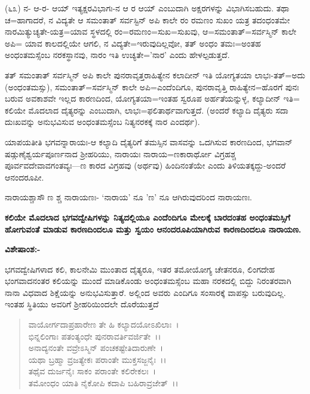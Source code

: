 (೬೩) ನ- ಆ-ರ- ಆಯ್ ಇತ್ಯಕ್ಷರವಿಭಾಗಃ-ನ ಆ ರ ಆಯ್ ಎಂಬುದಾಗಿ ಅಕ್ಷರಗಳನ್ನು ವಿಭಾಗಿಸಬಹುದು. ತಥಾ ಚ=ಹಾಗಾದರೆ, ನ ವಿದ್ಯತೇ ಆ ಸಮಂತಾತ್ ಸರ್ವಸ್ಟಿನ್ ಅಪಿ ಕಾಲೇ ರಂ ರಮಣಂ ಸುಖಂ ಯತ್ರ ತದಂಧಂತಮೇ ನಾರಮಿತ್ಯುಚ್ಯತೇ-ಯತ್ರ=ಯಾವ ಸ್ಥಳದಲ್ಲಿ ರಂ=ರಮಣಂ=ಸುಖ=ಸುಖವು, ಆ=ಸಮಂತಾತ್=ಸರ್ವಸ್ಮಿನ್ ಕಾಲೇ ಅಪಿ= ಯಾವ ಕಾಲದಲ್ಲಿಯೇ ಆಗಲಿ, ನ ವಿದ್ಯತೇ=ಇರುವುದಿಲ್ಲವೋ, ತತ್ ಅಂಧಂ ತಮಃ=ಅಂತಹ ಅಂಧಂತಮಸ್ಸೆಂಬ ನರಕಸ್ಥಾನವು, ನಾರಂ ಇತಿ ಉಚ್ಯತೇ='ನಾರ' ಎಂದು ಹೇಳಲ್ಪಡುತ್ತದೆ.

ತತ್ ಸಮಂತಾತ್ ಸರ್ವಸ್ಮಿನ್ ಅಪಿ ಕಾಲೇ ಪುನರಾವೃತ್ತರಾಹಿತ್ಯೇನ ಕಲಾದೀನ್ ಇತಿ ಯೋಗ್ಯತಯಾ ಲಾಭಃ-ತತ್=ಅದು (ಅಂಧಂತಮಸ್ಸು), ಸಮಂತಾತ್=ಸರ್ವಸ್ಮಿನ್ ಕಾಲೇ ಅಪಿ=ಎಂದೆಂದಿಗೂ, ಪುನರಾವೃತ್ತಿ ರಾಹಿತ್ಯೇನ=ಹೊರಗೆ ಪುನಃ ಬರುವ ಅವಕಾಶವೇ ಇಲ್ಲದ ಕಾರಣದಿಂದ, ಯೋಗ್ಯತಯಾ=ಇಂತಹ ಸ್ವರೂಪ ಅರ್ಹತೆಯನ್ನುಳ್ಳ, ಕಲ್ಯಾದೀನ್ ಇತಿ= ಕಲಿಯೇ ಮೊದಲಾದ ದೈತ್ಯರನ್ನು ಎಂಬುದಾಗಿ, ಲಾಭಃ=ಫಲಿತಾರ್ಥವಾಗುತ್ತದೆ. (ಅಂದರೆ ಕಲ್ಯಾದಿ ದೈತ್ಯರು ಸದಾ ದುಃಖವನ್ನು ಅನುಭವಿಸುವ ಅಂಧಂತಮಸ್ಸೆಂಬ ನಿತ್ಯನರಕಕ್ಕೆ ನಾರ ಎಂದರ್ಥ).

ಯಾಪಯತೀತಿ ಭಗವನ್ನಾರಾಯಃ-ಆ ಕಲ್ಯಾದಿ ದೈತ್ಯರಿಗೆ ತಮಸ್ಸಿನ ವಾಸವನ್ನು ಒದಗಿಸುವ ಕಾರಣದಿಂದ, ಭಗವಾನ್ ಷಡ್ಗುಣೈಶ್ವರ್ಯಪೂರ್ಣನಾದ ಶ‍್ರೀಹರಿಯು, ನಾರಾಯಃ ನಾರಾಯ=ಣಕಾರಾರ್ಥೋ ವಿಗ್ರಹಶ್ಚ ಪೂರ್ವವದೇವಾವಗಂತವ್ಯಃ—ಣ ಕಾರದ ವಿಗ್ರಹವು (ಅರ್ಥವು) ಹಿಂದಿನಂತೆಯೇ ಎಂದು ತಿಳಿಯತಕ್ಕದ್ದು-ಅಂದರೆ ಆನಂದರೂಪೀ.

ನಾರಾಯಶ್ಚಾಸೌ ಣ ಶ್ಚ ನಾರಾಯಣಃ- `ನಾರಾಯ' ನೂ 'ಣ' ನೂ ಆಗಿರುವುದರಿಂದ ನಾರಾಯಣಃ.

\begin{center}
\textbf{ಕಲಿಯೇ ಮೊದಲಾದ ಭಗವದ್ವೇಷಿಗಳನ್ನು ನಿತ್ಯದಲ್ಲಿಯೂ ಎಂದೆಂದಿಗೂ ಮೇಲಕ್ಕೆ ಬಾರದಂತಹ ಅಂಧಂತಮಸ್ಸಿಗೆ ಹೋಗುವಂತೆ ಮಾಡುವ ಕಾರಣದಿಂದಲೂ ಮತ್ತು ಸ್ವಯಂ ಆನಂದರೂಪಿಯಾಗಿರುವ ಕಾರಣದಿಂದಲೂ ನಾರಾಯಣ.}
\end{center}

\noindent
\textbf{ವಿಶೇಷಾಂಶ:-}

ಭಗವದ್ವೇಷಿಗಳಾದ ಕಲಿ, ಕಾಲನೇಮಿ ಮುಂತಾದ ದೈತ್ಯರೂ, ಇತರ ತಮೋಯೋಗ್ಯ ಚೇತನರೂ, ಲಿಂಗದೇಹ ಭಂಗವಾದನಂತರ ಕಲಿಯನ್ನು ಮುಂದೆ ಮಾಡಿಕೊಂಡು ಅಂಧಂತಮಸ್ಸೆಂಬ ಮಹಾ ನರಕದಲ್ಲಿ ಬಿದ್ದು ನಿರಂತರವಾಗಿ ನಾನಾ ವಿಧವಾದ ಶಿಕ್ಷೆಯನ್ನು ಅನುಭವಿಸುತ್ತಾರೆ. ಅಲ್ಲಿಂದ ಅವರು ಎಂದಿಗೂ ಸಂಸಾರಕ್ಕೆ ವಾಪಸ್ಸು ಬರುವುದಿಲ್ಲ. ಇಂತಹ ಸ್ಥಿತಿಯು ಅವರಿಗೆ ಶ‍್ರೀಹರಿಯಿಂದಲೇ ದೊರೆಯುತ್ತದೆ

\begin{verse}
ವಾಯೋರ್ಗದಾಪ್ರಹಾರೇಣ ತೇ ಹಿ ಕಲ್ಯಾದಯೋಽಖಿಲಾಃ~।\\ ಭಿನ್ನಲಿಂಗಾಃ ಪತಂತ್ಯಂಧೇ ಪುನರಾವರ್ತಿವರ್ಜಿತೇ~।।\\ ಅನಾದ್ಯನಂತೇ ವವ್ರೇಽಸ್ಮಿನ್ ಪಂಚಕಷ್ಟೇತಿದಾರುಣೇ~।\\ ಯಥಾ ಬ್ರಹ್ಮಾ ವ್ರಜತ್ಯೇಕಃ ಪರಾಂತೇ ಮುಕ್ತಸಜ್ಜನೈಃ~।।\\ ತಥೈವ ದುರ್ಜನೈಃ ಸಾಕಂ ಪರಾಂತೇ ಕಲಿರೇಕಲಃ~।\\ ತಮೋಂಧಂ ಯಾತಿ ನೈಕೋಪಿ ಕದಾಪಿ ಬಹಿರಾವ್ರಜೇತ್~।।
\end{verse}


